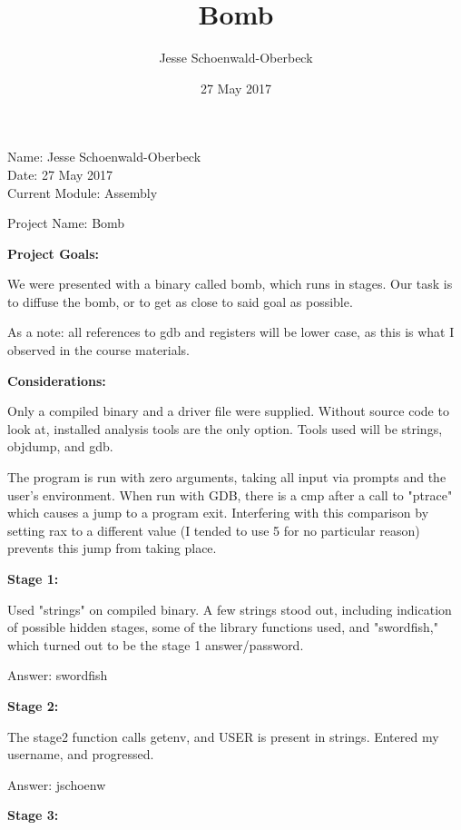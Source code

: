\documentclass{article}
\title{Bomb}
\author{Jesse Schoenwald-Oberbeck}
\date{27 May 2017}
\begin{document}
    Name: Jesse Schoenwald-Oberbeck \\
    Date: 27 May 2017 \\
    Current Module: Assembly

    Project Name: Bomb
    \bigskip

    \textbf{Project Goals:}

    We were presented with a binary called bomb, which runs in stages. Our task is to diffuse the bomb, or to get as close to said goal as possible.

    \bigskip

    As a note: all references to gdb and registers will be lower case, as this is what I observed in the course materials.

    \bigskip

    \textbf{Considerations:}

    Only a compiled binary and a driver file were supplied. Without source code to look at, installed analysis tools are the only option. Tools used will be strings, objdump, and gdb.

    \bigskip

    The program is run with zero arguments, taking all input via prompts and the user's environment.
    When run with GDB, there is a cmp after a call to "ptrace" which causes a jump to a program exit. Interfering with this comparison by setting rax to a different value (I tended to use 5 for no particular reason) prevents this jump from taking place.

    \bigskip

    \textbf{Stage 1:}

    \bigskip
	Used "strings" on compiled binary. A few strings stood out, including indication of possible hidden stages, some of the library functions used, and "swordfish," which turned out to be the stage 1 answer/password.

    \bigskip

	Answer: swordfish

    \bigskip

    \textbf{Stage 2:}

    \bigskip

	The stage2 function calls getenv, and USER is present in strings. Entered my username, and progressed.

    \bigskip

	Answer: jschoenw

    \bigskip

    \textbf{Stage 3:}
\end{document}
